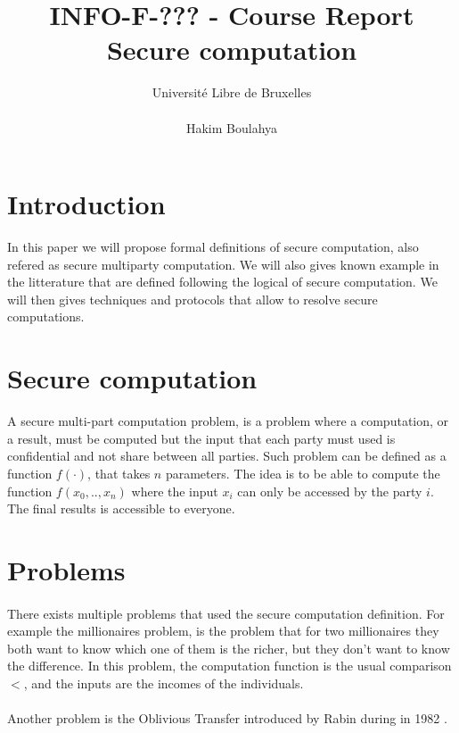\documentclass[10pt,a4paper]{article}
\title{INFO-F-??? -     Course Report \\
Secure computation}
\author{Université Libre de Bruxelles \\
\\ Hakim Boulahya}
\begin{document}
\maketitle


\section{Introduction}

In this paper we will propose formal definitions of secure
computation, also refered as secure multiparty computation.
We will also gives known example in the litterature
that are defined following the logical of secure computation.
We will then gives techniques and protocols that allow
to resolve secure computations.

\section{Secure computation}

A secure multi-part computation problem, is a problem where a computation,
or a result, must be computed but the input that each party must used
is confidential and not share between all parties. Such problem
can be defined as a function $f(\cdot)$, that takes $n$ parameters.
The idea is to be able to compute the function $f(x_0, .., x_n)$
where the input $x_i$ can only be accessed by the party $i$.
The final results is accessible to everyone.

\section{Problems}

\paragraph{}


There exists multiple problems that used the secure computation definition.
For example the millionaires problem, is the problem that for two millionaires
they both want to know which one of them is the richer, but they
don't want to know the difference. In this problem, the computation
function is the usual comparison $<$, and the inputs are the incomes of
the individuals.


\paragraph{}
Another problem is the Oblivious Transfer introduced by Rabin during
in 1982 \cite{rabin}.





\end{document}
